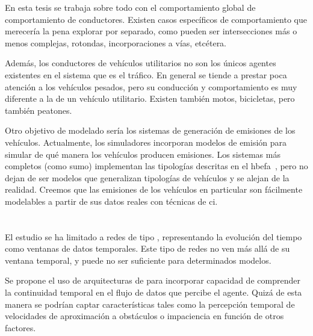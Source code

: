 En esta tesis se trabaja sobre todo con el comportamiento global de comportamiento de conductores. Existen casos específicos de comportamiento que merecería la pena explorar por separado, como pueden ser intersecciones más o menos complejas, rotondas, incorporaciones a vías, etcétera.

Además, los conductores de vehículos utilitarios no son los únicos agentes existentes en el sistema que es el tráfico. En general se tiende a prestar poca atención a los vehículos pesados, pero su conducción y comportamiento es muy diferente a la de un vehículo utilitario. Existen también motos, bicicletas, pero también peatones.

Otro objetivo de modelado sería los sistemas de generación de emisiones de los vehículos. Actualmente, los simuladores incorporan modelos de emisión para simular de qué manera los vehículos producen emisiones. Los sistemas más completos (como \gls{sumo}) implementan las tipologías descritas en el \gls{hbefa}~\cite{de2004modelling}, pero no dejan de ser modelos que generalizan tipologías de vehículos y se alejan de la realidad. Creemos que las emisiones de los vehículos en particular son fácilmente modelables a partir de sus datos reales con técnicas de \ac{ci}.

\section{}

El estudio se ha limitado a redes de tipo \textit{}, representando la evolución del tiempo como ventanas de datos temporales. Este tipo de redes no ven más allá de su ventana temporal, y puede no ser suficiente para determinados modelos.

Se propone el uso de arquitecturas de  para incorporar capacidad de comprender la continuidad temporal en el flujo de datos que percibe el agente. Quizá de esta manera se podrían captar características tales como la percepción temporal de velocidades de aproximación a obstáculos o impaciencia en función de otros factores.